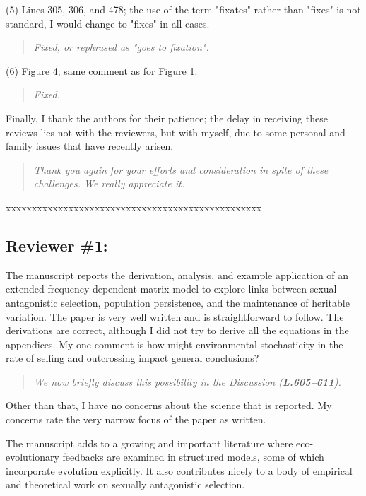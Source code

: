 \documentclass[11pt]{article}
\begin{document}
\noindent (5) Lines 305, 306, and 478; the use of the term "fixates" rather than "fixes" is not standard, I would change to "fixes" in all cases.
\begin{quote}
	{\itshape Fixed, or rephrased as "goes to fixation".}
\end{quote}

\noindent (6) Figure 4; same comment as for Figure 1.
\begin{quote}
	{\itshape Fixed.}
\end{quote}

Finally, I thank the authors for their patience; the delay in receiving these reviews lies not with the reviewers, but with myself, due to some personal and family issues that have recently arisen.

\begin{quote}
	{\itshape Thank you again for your efforts and consideration in spite of these challenges. We really appreciate it.}
\end{quote}


\noindent xxxxxxxxxxxxxxxxxxxxxxxxxxxxxxxxxxxxxxxxxxxxxxxxx

\subsection*{Reviewer \#1:}

The manuscript reports the derivation, analysis, and example application of an extended frequency-dependent matrix model to explore links between sexual antagonistic selection, population persistence, and the maintenance of heritable variation. The paper is very well written and is straightforward to follow. The derivations are correct, although I did not try to derive all the equations in the appendices. My one comment is how might environmental stochasticity in the rate of selfing and outcrossing impact general conclusions? 
\begin{quote}
	{\itshape We now briefly discuss this possibility in the Discussion ({\bf L.605--611}).}
\end{quote}


Other than that, I have no concerns about the science that is reported. My concerns rate the very narrow focus of the paper as written.

The manuscript adds to a growing and important literature where eco-evolutionary feedbacks are examined in structured models, some of which incorporate evolution explicitly. It also contributes nicely to a body of empirical and theoretical work on sexually antagonistic selection.
\end{document}
